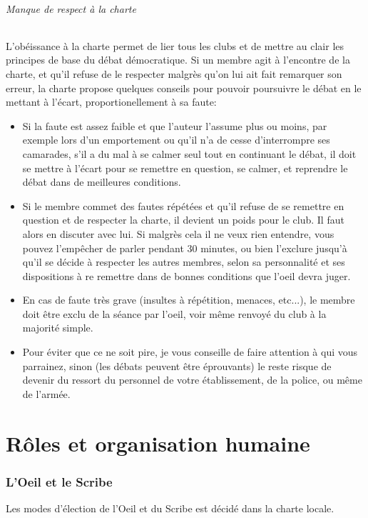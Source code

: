 \documentclass[a4paper,12pt]{article}
\begin{document}
\paragraph{Manque de respect à la charte}
L'obéissance à la charte permet de lier tous les clubs et de mettre au clair les principes de base du débat démocratique. Si un membre agit à l'encontre de la charte, et qu'il refuse de le respecter malgrès qu'on lui ait fait remarquer son erreur, la charte propose quelques conseils pour pouvoir poursuivre le débat en le mettant à l'écart, proportionellement à sa faute:
\begin{itemize}
  \item Si la faute est assez faible et que l'auteur l'assume plus ou moins, par exemple lors d'un emportement ou qu'il n'a de cesse d'interrompre ses camarades, s'il a du mal à se calmer seul tout en continuant le débat, il doit se mettre à l'écart pour se remettre en question, se calmer, et reprendre le débat dans de meilleures conditions.
  \item Si le membre commet des fautes répétées et qu'il refuse de se remettre en question et de respecter la charte, il devient un poids pour le club. Il faut alors en discuter avec lui. Si malgrès cela il ne veux rien entendre, vous pouvez l'empêcher de parler pendant 30 minutes, ou bien l'exclure jusqu'à qu'il se décide à respecter les autres membres, selon sa personnalité et ses dispositions à re remettre dans de bonnes conditions que l'oeil devra juger.
  \item En cas de faute très grave (insultes à répétition, menaces, etc...), le membre doit être exclu de la séance par l'oeil, voir même renvoyé du club à la majorité simple.
  \item Pour éviter que ce ne soit pire, je vous conseille de faire attention à qui vous parrainez, sinon (les débats peuvent être éprouvants) le reste risque de devenir du ressort du personnel de votre établissement, de la police, ou même de l'armée.
\end{itemize}


\part{Rôles et organisation humaine}
\section{L'Oeil et le Scribe}
Les modes d'élection de l'Oeil et du Scribe est décidé dans la charte locale.
\end{document}
